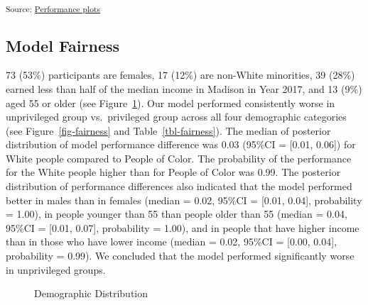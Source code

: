 \documentclass[
  letterpaper,
  DIV=11,
  numbers=noendperiod]{scrartcl}
\begin{document}
\textsubscript{Source:
\href{https://jjcurtin.github.io/study_messages/notebooks/fig_auroc-preview.html\#cell-fig-auroc_posterior}{Performance
plots}}

\subsection{Model Fairness}\label{model-fairness}

73 (53\%) participants are females, 17 (12\%) are non-White minorities,
39 (28\%) earned less than half of the median income in Madison in Year
2017, and 13 (9\%) aged 55 or older (see Figure~\ref{fig-demographics}).
Our model performed consistently worse in unprivileged group
vs.~privileged group across all four demographic categories (see
Figure~\ref{fig-fairness} and Table~\ref{tbl-fairness}). The median of
posterior distribution of model performance difference was 0.03 (95\%CI
= {[}0.01, 0.06{]}) for White people compared to People of Color. The
probability of the performance for the White people higher than for
People of Color was 0.99. The posterior distribution of performance
differences also indicated that the model performed better in males than
in females (median = 0.02, 95\%CI = {[}0.01, 0.04{]}, probability =
1.00), in people younger than 55 than people older than 55 (median =
0.04, 95\%CI = {[}0.01, 0.07{]}, probability = 1.00), and in people that
have higher income than in those who have lower income (median = 0.02,
95\%CI = {[}0.00, 0.04{]}, probability = 0.99). We concluded that the
model performed significantly worse in unprivileged groups.

\begin{figure}[H]


\caption{\label{fig-demographics}Demographic Distribution}

\end{figure}%
\end{document}
